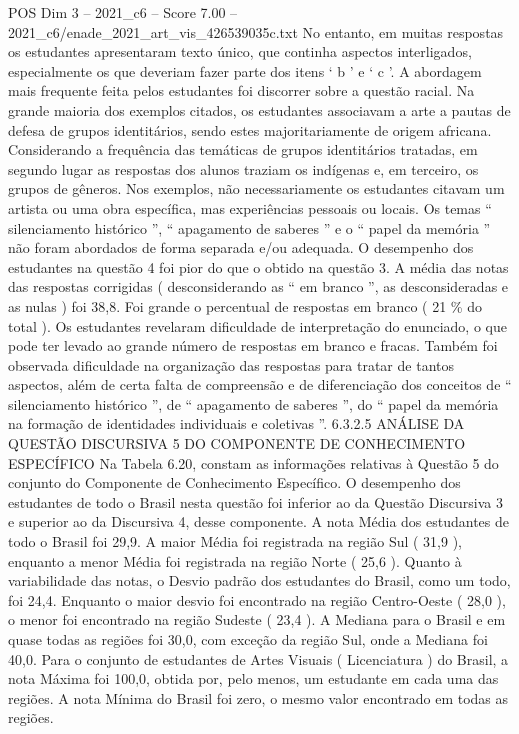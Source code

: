 \begin{textsample}{POS Dim 3 – 2021\_c6 – Score 7.00 – 2021\_c6/enade\_2021\_art\_vis\_426539035c.txt}
No entanto, em muitas respostas os estudantes apresentaram texto único, que continha aspectos interligados, especialmente os que deveriam fazer parte dos itens ‘ b ’ e ‘ c ’.
A abordagem mais frequente feita pelos estudantes foi discorrer sobre a questão racial.
Na grande maioria dos exemplos citados, os estudantes associavam a arte a pautas de defesa de grupos identitários, sendo estes majoritariamente de origem africana.
Considerando a frequência das temáticas de grupos identitários tratadas, em segundo lugar as respostas dos alunos traziam os indígenas e, em terceiro, os grupos de gêneros.
Nos exemplos, não necessariamente os estudantes citavam um artista ou uma obra específica, mas experiências pessoais ou locais.
Os temas “ silenciamento histórico ”, “ apagamento de saberes ” e o “ papel da memória ” não foram abordados de forma separada e/ou adequada.
O desempenho dos estudantes na questão 4 foi pior do que o obtido na questão 3.
A média das notas das respostas corrigidas ( desconsiderando as “ em branco ”, as desconsideradas e as nulas ) foi 38,8.
Foi grande o percentual de respostas em branco ( 21 \% do total ).
Os estudantes revelaram dificuldade de interpretação do enunciado, o que pode ter levado ao grande número de respostas em branco e fracas.
Também foi observada dificuldade na organização das respostas para tratar de tantos aspectos, além de certa falta de compreensão e de diferenciação dos conceitos de “ silenciamento histórico ”, de “ apagamento de saberes ”, do “ papel da memória na formação de identidades individuais e coletivas ”. 6.3.2.5 ANÁLISE DA QUESTÃO DISCURSIVA 5 DO COMPONENTE DE CONHECIMENTO ESPECÍFICO Na Tabela 6.20, constam as informações relativas à Questão 5 do conjunto do Componente de Conhecimento Específico.
O desempenho dos estudantes de todo o Brasil nesta questão foi inferior ao da Questão Discursiva 3 e superior ao da Discursiva 4, desse componente.
A nota Média dos estudantes de todo o Brasil foi 29,9.
A maior Média foi registrada na região Sul ( 31,9 ), enquanto a menor Média foi registrada na região Norte ( 25,6 ).
Quanto à variabilidade das notas, o Desvio padrão dos estudantes do Brasil, como um todo, foi 24,4.
Enquanto o maior desvio foi encontrado na região Centro-Oeste ( 28,0 ), o menor foi encontrado na região Sudeste ( 23,4 ).
A Mediana para o Brasil e em quase todas as regiões foi 30,0, com exceção da região Sul, onde a Mediana foi 40,0.
Para o conjunto de estudantes de Artes Visuais ( Licenciatura ) do Brasil, a nota Máxima foi 100,0, obtida por, pelo menos, um estudante em cada uma das regiões.
A nota Mínima do Brasil foi zero, o mesmo valor encontrado em todas as regiões.

\end{textsample}
